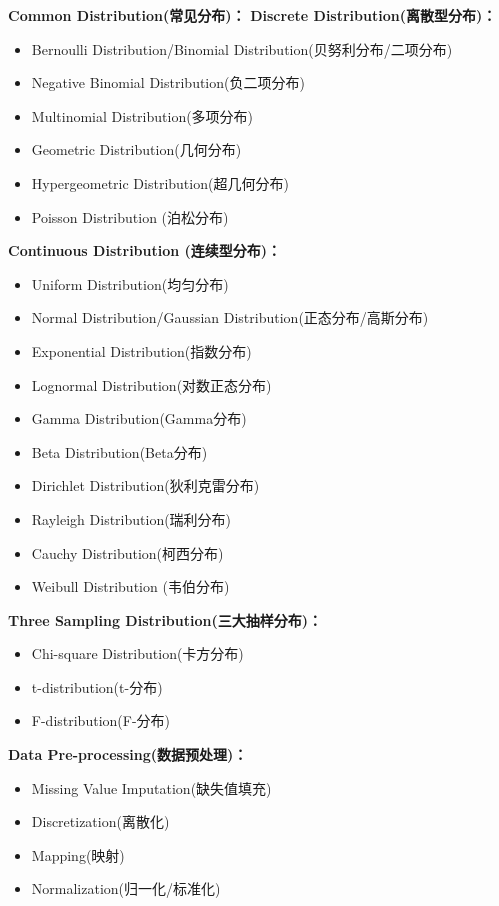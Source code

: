 \documentclass[10pt,a4paper]{ctexbook}
\begin{document}
\textbf{Common Distribution(常见分布)：}
\textbf{Discrete Distribution(离散型分布)：}
\begin{itemize}
\item Bernoulli Distribution/Binomial Distribution(贝努利分布/二项分布)
\item Negative Binomial Distribution(负二项分布)
\item Multinomial Distribution(多项分布)
\item Geometric Distribution(几何分布)
\item Hypergeometric Distribution(超几何分布)
\item Poisson Distribution (泊松分布)
\end{itemize}

\textbf{Continuous Distribution (连续型分布)：}
\begin{itemize}
\item Uniform Distribution(均匀分布)
\item Normal Distribution/Gaussian Distribution(正态分布/高斯分布)
\item Exponential Distribution(指数分布)
\item Lognormal Distribution(对数正态分布)
\item Gamma Distribution(Gamma分布)
\item Beta Distribution(Beta分布)
\item Dirichlet Distribution(狄利克雷分布)
\item Rayleigh Distribution(瑞利分布)
\item Cauchy Distribution(柯西分布)
\item Weibull Distribution (韦伯分布)
\end{itemize}

\textbf{Three Sampling Distribution(三大抽样分布)：}
\begin{itemize}
\item Chi-square Distribution(卡方分布)
\item t-distribution(t-分布)
\item F-distribution(F-分布)
\end{itemize}

\textbf{Data Pre-processing(数据预处理)：}
\begin{itemize}
\item Missing Value Imputation(缺失值填充)
\item Discretization(离散化)
\item Mapping(映射)
\item Normalization(归一化/标准化)
\end{itemize}
\end{document}
